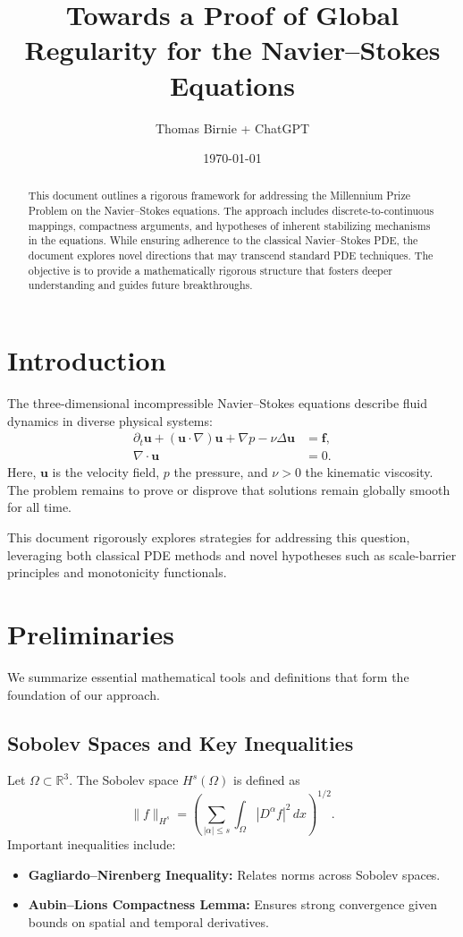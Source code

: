 \documentclass[12pt]{article}
\title{Towards a Proof of Global Regularity for the Navier--Stokes Equations}
\author{Thomas Birnie + ChatGPT}
\date{\today}
\numberwithin{equation}{section}
\begin{document}
\maketitle

\begin{abstract}
This document outlines a rigorous framework for addressing the Millennium Prize Problem on the Navier--Stokes equations. The approach includes discrete-to-continuous mappings, compactness arguments, and hypotheses of inherent stabilizing mechanisms in the equations. While ensuring adherence to the classical Navier--Stokes PDE, the document explores novel directions that may transcend standard PDE techniques. The objective is to provide a mathematically rigorous structure that fosters deeper understanding and guides future breakthroughs.
\end{abstract}

\tableofcontents

\section{Introduction}
The three-dimensional incompressible Navier--Stokes equations describe fluid dynamics in diverse physical systems:
\begin{align}
    \partial_t \mathbf{u} + (\mathbf{u} \cdot \nabla) \mathbf{u} + \nabla p - \nu \Delta \mathbf{u} &= \mathbf{f}, \label{eq:momentum} \\
    \nabla \cdot \mathbf{u} &= 0. \label{eq:incompressibility}
\end{align}
Here, $\mathbf{u}$ is the velocity field, $p$ the pressure, and $\nu > 0$ the kinematic viscosity. The problem remains to prove or disprove that solutions remain globally smooth for all time.

This document rigorously explores strategies for addressing this question, leveraging both classical PDE methods and novel hypotheses such as scale-barrier principles and monotonicity functionals.

\section{Preliminaries}
We summarize essential mathematical tools and definitions that form the foundation of our approach.

\subsection{Sobolev Spaces and Key Inequalities}
Let $\Omega \subset \mathbb{R}^3$. The Sobolev space $H^s(\Omega)$ is defined as
\begin{equation}
    \|f\|_{H^s} = \left(\sum_{|\alpha| \leq s} \int_{\Omega} |D^\alpha f|^2 \, dx \right)^{1/2}.
\end{equation}
Important inequalities include:
\begin{itemize}
    \item \textbf{Gagliardo--Nirenberg Inequality:} Relates norms across Sobolev spaces.
    \item \textbf{Aubin--Lions Compactness Lemma:} Ensures strong convergence given bounds on spatial and temporal derivatives.
\end{itemize}
\end{document}
